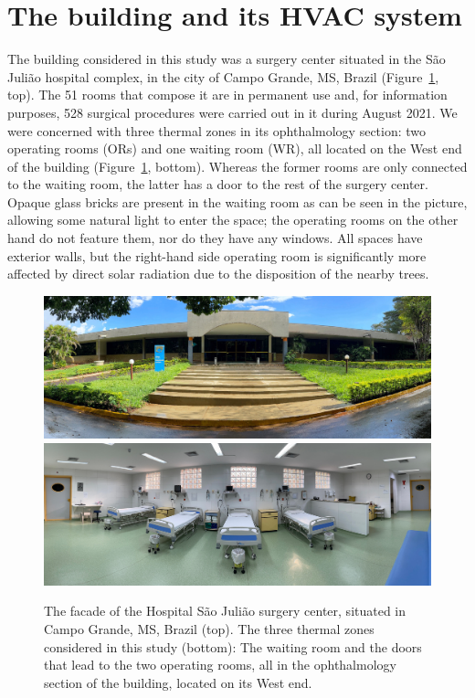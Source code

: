 \section{The building and its HVAC system}
\label{sec.building_and_hvac}

The building considered in this study was a surgery center situated in the São Julião hospital complex, in the city of Campo Grande, MS, Brazil (Figure~\ref{fig.facadeAndRooms}, top). The 51 rooms that compose it are in permanent use and, for information purposes, 528 surgical procedures were carried out in it during August 2021. We were concerned with three thermal zones in its ophthalmology section: two operating rooms (ORs) and one waiting room (WR), all located on the West end of the building (Figure~\ref{fig.facadeAndRooms}, bottom). Whereas the former rooms are only connected to the waiting room, the latter has a door to the rest of the surgery center. Opaque glass bricks are present in the waiting room as can be seen in the picture, allowing some natural light to enter the space; the operating rooms on the other hand do not feature them, nor do they have any windows. All spaces have exterior walls, but the right-hand side operating room is significantly more affected by direct solar radiation due to the disposition of the nearby trees.

\begin{figure}[!t]
	\centering
	\includegraphics[width=0.9\linewidth]{../images/chap3_facade.jpg} \\[8pt]
	\includegraphics[width=0.9\linewidth]{../images/chap3_rooms.jpg} 
	\caption{The facade of the Hospital São Julião surgery center, situated in Campo Grande, MS, Brazil (top). The three thermal zones considered in this study (bottom): The waiting room and the doors that lead to the two operating rooms, all in the ophthalmology section of the building, located on its West end.}
	\label{fig.facadeAndRooms}
\end{figure}

